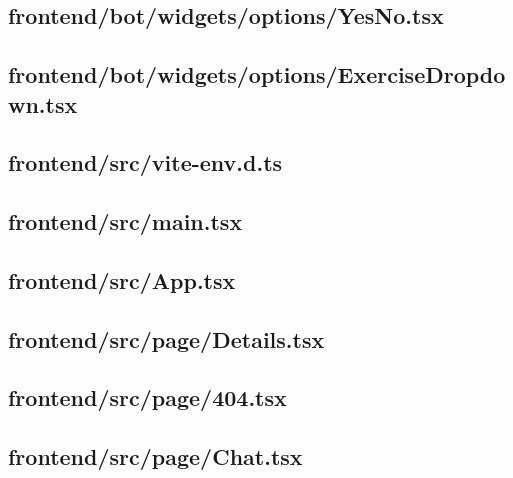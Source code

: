 \subsection*{frontend/bot/widgets/options/YesNo.tsx}


\subsection*{frontend/bot/widgets/options/ExerciseDropdown.tsx}


\subsection*{frontend/src/vite-env.d.ts}


\subsection*{frontend/src/main.tsx}


\subsection*{frontend/src/App.tsx}


\subsection*{frontend/src/page/Details.tsx}


\subsection*{frontend/src/page/404.tsx}


\subsection*{frontend/src/page/Chat.tsx}


